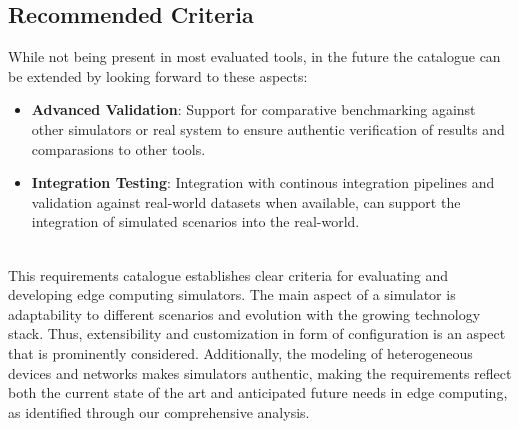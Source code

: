 \subsection{Recommended Criteria}
While not being present in most evaluated tools, in the future the catalogue can be extended by looking forward to these aspects:
\begin{itemize}
  \item \textbf{Advanced Validation}:
        Support for comparative benchmarking against other simulators or real system to ensure authentic verification of results and comparasions to other tools.
  \item \textbf{Integration Testing}:
        Integration with continous integration pipelines and validation against real-world datasets when available, can support the integration of simulated scenarios into the real-world.
\end{itemize}
\ \\
This requirements catalogue establishes clear criteria for evaluating and developing edge computing simulators.
The main aspect of a simulator is adaptability to different scenarios and evolution with the growing technology stack.
Thus, extensibility and customization in form of configuration is an aspect that is prominently considered.
Additionally, the modeling of heterogeneous devices and networks makes simulators authentic, making the requirements reflect both the current state of the art and anticipated future needs in edge computing, as identified through our comprehensive analysis.
